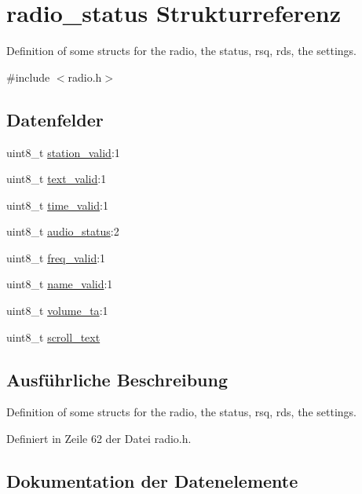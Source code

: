 \hypertarget{structradio__status}{}\section{radio\+\_\+status Strukturreferenz}
\label{structradio__status}


Definition of some structs for the radio, the status, rsq, rds, the settings.  




{\ttfamily \#include $<$radio.\+h$>$}

\subsection*{Datenfelder}
\begin{DoxyCompactItemize}
\item 
uint8\+\_\+t \hyperlink{structradio__status_ad84d780e2e45afd62830f27f2d4dbd9a}{station\+\_\+valid}\+:1
\item 
uint8\+\_\+t \hyperlink{structradio__status_a6a0d33cd9094edee0dad3deb6b386914}{text\+\_\+valid}\+:1
\item 
uint8\+\_\+t \hyperlink{structradio__status_a11ae5e5b507c175049a332002aa85849}{time\+\_\+valid}\+:1
\item 
uint8\+\_\+t \hyperlink{structradio__status_afd0f6d5999f07ea569f9492eb4ceb21a}{audio\+\_\+status}\+:2
\item 
uint8\+\_\+t \hyperlink{structradio__status_a3e502e1dcdc44fc044b4f4b43f35a19a}{freq\+\_\+valid}\+:1
\item 
uint8\+\_\+t \hyperlink{structradio__status_a88955dc0fd5d9169c68603ba777b643f}{name\+\_\+valid}\+:1
\item 
uint8\+\_\+t \hyperlink{structradio__status_aa8bc97428a85a9013ed525f6f612a112}{volume\+\_\+ta}\+:1
\item 
uint8\+\_\+t \hyperlink{structradio__status_a16198f5b3b66ddcf01c81f6177af500f}{scroll\+\_\+text}
\end{DoxyCompactItemize}


\subsection{Ausführliche Beschreibung}
Definition of some structs for the radio, the status, rsq, rds, the settings. 

Definiert in Zeile 62 der Datei radio.\+h.



\subsection{Dokumentation der Datenelemente}
\hypertarget{structradio__status_afd0f6d5999f07ea569f9492eb4ceb21a}{}
